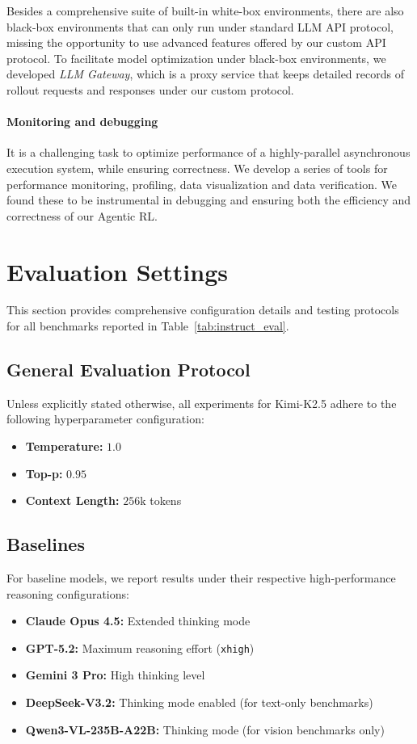 \documentclass{article}
\begin{document}
Besides a comprehensive suite of built-in white-box environments, there are also black-box environments that can only run under standard LLM API protocol, missing the opportunity to use advanced features offered by our custom API protocol. To facilitate model optimization under black-box environments, 
we developed \textit{LLM Gateway}, which is a proxy service that keeps detailed records of rollout requests and responses under our custom protocol.  

\paragraph{Monitoring and debugging} It is a challenging task to optimize performance of a highly-parallel asynchronous execution system, while ensuring correctness. We develop a series of tools for performance monitoring, profiling, data visualization and data verification. We found these to be instrumental in debugging and ensuring both the efficiency and correctness of our Agentic RL.

\section{Evaluation Settings}
\label{app:eval_details}

This section provides comprehensive configuration details and testing protocols for all benchmarks reported in Table~\ref{tab:instruct_eval}.

\subsection{General Evaluation Protocol}
\label{app:eval_general}

Unless explicitly stated otherwise, all experiments for Kimi-K2.5 adhere to the following hyperparameter configuration:
\begin{itemize}
    \item \textbf{Temperature:} $1.0$
    \item \textbf{Top-p:} $0.95$
    \item \textbf{Context Length:} $256\text{k}$ tokens
\end{itemize}

\subsection{Baselines}
For baseline models, we report results under their respective high-performance reasoning configurations:
\begin{itemize}
    \item \textbf{Claude Opus 4.5:} Extended thinking mode
    \item \textbf{GPT-5.2:} Maximum reasoning effort (\texttt{xhigh})
    \item \textbf{Gemini 3 Pro:} High thinking level
    \item \textbf{DeepSeek-V3.2:} Thinking mode enabled (for text-only benchmarks)
    \item \textbf{Qwen3-VL-235B-A22B:} Thinking mode (for vision benchmarks only)
\end{itemize}
\end{document}
